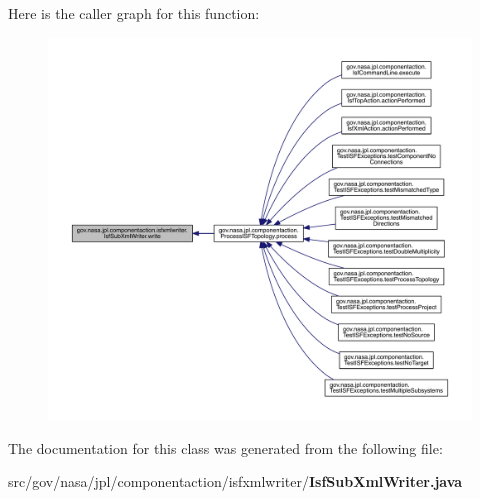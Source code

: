 Here is the caller graph for this function\+:
\nopagebreak
\begin{figure}[H]
\begin{center}
\leavevmode
\includegraphics[width=350pt]{classgov_1_1nasa_1_1jpl_1_1componentaction_1_1isfxmlwriter_1_1_isf_sub_xml_writer_aac9a5a46864be525908f45400e336f01_icgraph}
\end{center}
\end{figure}




The documentation for this class was generated from the following file\+:\begin{DoxyCompactItemize}
\item 
src/gov/nasa/jpl/componentaction/isfxmlwriter/{\bf Isf\+Sub\+Xml\+Writer.\+java}\end{DoxyCompactItemize}
